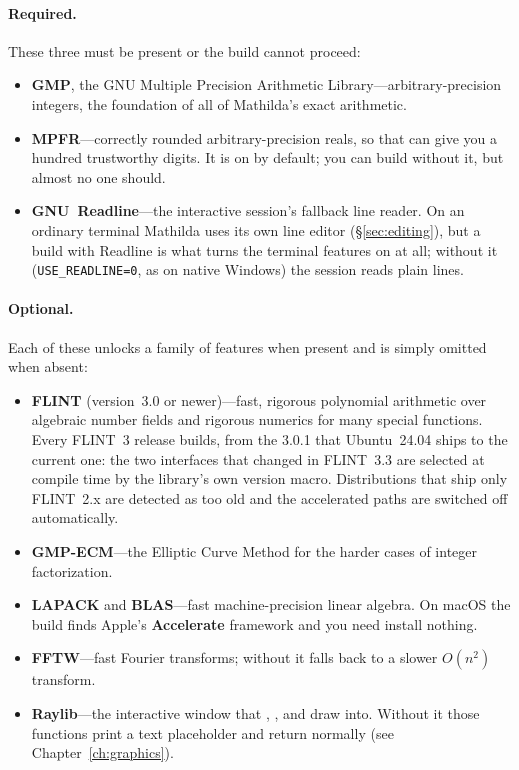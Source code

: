 \paragraph{Required.} These three must be present or the build cannot proceed:
\begin{itemize}
  \item \textbf{GMP}, the GNU Multiple Precision Arithmetic Library---arbitrary-precision
        integers, the foundation of all of Mathilda's exact arithmetic.
  \item \textbf{MPFR}---correctly rounded arbitrary-precision reals, so that 
        can give you a hundred trustworthy digits. It is on by default; you can build
        without it, but almost no one should.
  \item \textbf{GNU~Readline}---the interactive session's fallback line
        reader. On an ordinary terminal Mathilda uses its own line editor
        (\S\ref{sec:editing}), but a build with Readline is what turns the
        terminal features on at all; without it (\texttt{USE\_READLINE=0}, as on
        native Windows) the session reads plain lines.
\end{itemize}

\paragraph{Optional.} Each of these unlocks a family of features when present and is
simply omitted when absent:
\begin{itemize}
  \item \textbf{FLINT} (version~3.0 or newer)---fast, rigorous polynomial arithmetic
        over algebraic number fields and rigorous numerics for many special
        functions. Every FLINT~3 release builds, from the 3.0.1 that Ubuntu~24.04
        ships to the current one: the two interfaces that changed in FLINT~3.3 are
        selected at compile time by the library's own version
        macro. Distributions that ship only
        FLINT~2.x are detected as too old and the accelerated paths are switched off
        automatically.
  \item \textbf{GMP-ECM}---the Elliptic Curve Method for the harder cases of integer
        factorization.
  \item \textbf{LAPACK} and \textbf{BLAS}---fast machine-precision linear algebra. On
        macOS the build finds Apple's \textbf{Accelerate} framework and you need
        install nothing.
  \item \textbf{FFTW}---fast Fourier transforms; without it  falls back to
        a slower $O(n^2)$ transform.
  \item \textbf{Raylib}---the interactive window that , , and 
        draw into. Without it those functions print a text placeholder and return
        normally (see Chapter~\ref{ch:graphics}).
\end{itemize}

